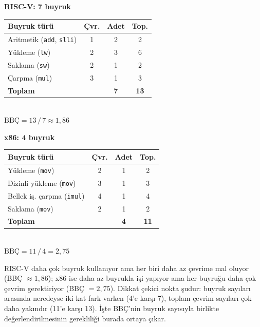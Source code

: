 \begin{center}
\begin{minipage}[t]{0.46\textwidth}
\centering
\small
\textbf{RISC-V\!: 7 buyruk}\\[4pt]
\begin{tabular}{@{}lccc@{}}
\toprule
\textbf{Buyruk türü} & \textbf{Çvr.} & \textbf{Adet} & \textbf{Top.} \\
\midrule
Aritmetik (\texttt{add}, \texttt{slli}) & 1 & 2 & 2 \\
Yükleme (\texttt{lw})                   & 2 & 3 & 6 \\
Saklama (\texttt{sw})                    & 2 & 1 & 2 \\
Çarpma (\texttt{mul})                    & 3 & 1 & 3 \\
\midrule
\textbf{Toplam}                          &   & \textbf{7} & \textbf{13} \\
\bottomrule
\end{tabular}
\\[6pt]
$\text{BBÇ} = 13\,/\,7 \approx 1{,}86$
\end{minipage}
\hfill
\begin{minipage}[t]{0.50\textwidth}
\centering
\small
\textbf{x86\!: 4 buyruk}\\[4pt]
\begin{tabular}{@{}lccc@{}}
\toprule
\textbf{Buyruk türü} & \textbf{Çvr.} & \textbf{Adet} & \textbf{Top.} \\
\midrule
Yükleme (\texttt{mov})            & 2 & 1 & 2 \\
Dizinli yükleme (\texttt{mov})    & 3 & 1 & 3 \\
Bellek iş. çarpma (\texttt{imul}) & 4 & 1 & 4 \\
Saklama (\texttt{mov})            & 2 & 1 & 2 \\
\midrule
\textbf{Toplam}                    &   & \textbf{4} & \textbf{11} \\
\bottomrule
\end{tabular}
\\[6pt]
$\text{BBÇ} = 11\,/\,4 = 2{,}75$
\end{minipage}
\end{center}

RISC-V daha çok buyruk kullanıyor ama her biri daha az çevrime mal oluyor (BBÇ $\approx 1{,}86$); x86 ise daha az buyrukla işi yapıyor ama her buyruğu daha çok çevrim gerektiriyor (BBÇ $= 2{,}75$). Dikkat çekici nokta şudur: buyruk sayıları arasında neredeyse iki kat fark varken (4'e karşı 7), toplam çevrim sayıları çok daha yakındır (11'e karşı 13). İşte BBÇ'nin buyruk sayısıyla birlikte değerlendirilmesinin gerekliliği burada ortaya çıkar.

